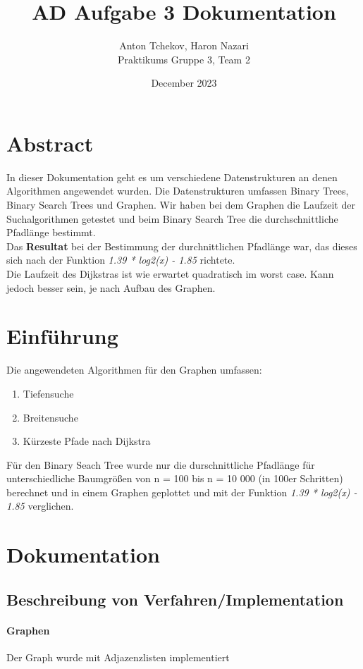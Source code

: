 \documentclass[utf8]{article}
\title{AD Aufgabe 3 Dokumentation}
\author{Anton Tchekov, Haron Nazari\\ Praktikums Gruppe 3, Team 2}
\date{December 2023}
\begin{document}
\maketitle

\tableofcontents
\pagebreak

\section{Abstract}
In dieser Dokumentation geht es um verschiedene Datenstrukturen an denen
Algorithmen angewendet wurden.
Die Datenstrukturen umfassen Binary Trees, Binary Search Trees und Graphen.
Wir haben bei dem Graphen die Laufzeit der Suchalgorithmen getestet und
beim Binary Search Tree die durchschnittliche Pfadlänge bestimmt.\\
Das \textbf{Resultat} bei der Bestimmung der durchnittlichen Pfadlänge war, das dieses sich nach der Funktion \emph{1.39 * log2(x) - 1.85} richtete.\\
Die Laufzeit des Dijkstras ist wie erwartet quadratisch im worst case. Kann jedoch besser sein, je nach Aufbau des Graphen.


\section{Einführung}
Die angewendeten Algorithmen für den Graphen umfassen:
\begin{enumerate}
  \item Tiefensuche
  \item Breitensuche
  \item Kürzeste Pfade nach Dijkstra
\end{enumerate}
Für den Binary Seach Tree wurde nur die durschnittliche Pfadlänge für
unterschiedliche Baumgrößen von n = 100 bis n = 10 000 (in 100er Schritten)
berechnet und in einem Graphen geplottet und mit der
Funktion \emph{1.39 * log2(x) - 1.85} verglichen.
\pagebreak
\section{Dokumentation}

\subsection{Beschreibung von Verfahren/Implementation}

\paragraph{Graphen}
Der Graph wurde mit Adjazenzlisten implementiert
\end{document}
